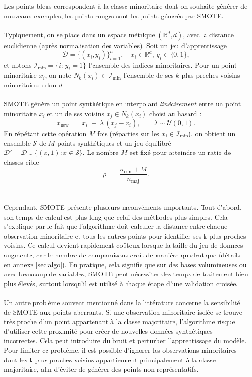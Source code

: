\documentclass{article}
\begin{document}
Les points bleus correspondent à la classe minoritaire dont on souhaite générer de nouveaux exemples, les points rouges sont les points générés par SMOTE.
\\
\\
Typiquement, on se place dans un espace métrique $(\mathbb{R}^d, d)$, avec la distance euclidienne (après normalisation des variables). Soit un jeu d'apprentissage
\[
\mathcal{D}=\{(x_i,y_i)\}_{i=1}^n,\quad x_i\in\mathbb{R}^d,\ y_i\in\{0,1\},
\]
et notons $\mathcal{I}_{\text{min}}=\{i:\,y_i=1\}$ l’ensemble des indices minoritaires. Pour un point minoritaire $x_i$, on note $N_k(x_i)\subset\mathcal{I}_{\text{min}}$ l’ensemble de ses $k$ plus proches voisins minoritaires selon $d$.
\\
\\
SMOTE génère un point synthétique en interpolant \emph{linéairement} entre un point minoritaire $x_i$ et un de ses voisins $x_j\in N_k(x_i)$ choisi au hasard :
\[
x_{\text{new}} \;=\; x_i \;+\; \lambda\,(x_j - x_i),
\qquad \lambda \sim \mathcal{U}(0,1).
\]
En répétant cette opération $M$ fois (réparties sur les $x_i\in\mathcal{I}_{\text{min}}$), on obtient un ensemble $\mathcal{S}$ de $M$ points synthétiques et un jeu équilibré $\mathcal{D}'=\mathcal{D}\cup\{(x,1):x\in\mathcal{S}\}$. Le nombre $M$ est fixé pour atteindre un ratio de classes cible
\[
\rho \;=\; \frac{n_{\text{min}} + M}{n_{\text{maj}}}.
\]
\\
\\
Cependant, SMOTE présente plusieurs inconvénients importants. Tout d’abord, son temps de calcul est plus long que celui des méthodes plus simples. Cela s’explique par le fait que l’algorithme doit calculer la distance
entre chaque observation minoritaire et tous les autres points pour identifier ses k plus proches voisins. Ce calcul devient rapidement coûteux lorsque la taille du jeu de données augmente, car le nombre de comparaisons croît de manière quadratique (détails en annexe \ref{sec:algo}). En pratique, cela signifie que sur des bases volumineuses ou avec beaucoup de variables, SMOTE peut nécessiter des temps de traitement bien plus élevés,
surtout lorsqu’il est utilisé à chaque étape d’une validation croisée.
\\
\\
Un autre problème souvent mentionné dans la littérature concerne la sensibilité de SMOTE aux points aberrants. Si une observation minoritaire isolée se trouve très proche d’un point appartenant à la classe majoritaire, l’algorithme risque d’utiliser cette proximité
pour créer de nouvelles données synthétiques incorrectes. Cela peut introduire du bruit et perturber l’apprentissage du modèle. Pour limiter ce problème, il est possible d’ignorer les observations minoritaires dont les k plus proches voisins appartiennent principalement
à la classe majoritaire, afin d’éviter de générer des points non représentatifs.\medskip
\end{document}
